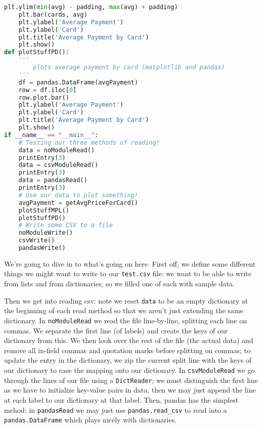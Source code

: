 \documentclass[11pt, twoside, reqno]{book}
\begin{document}
\begin{lstlisting}[language=Python]
    plt.ylim(min(avg) - padding, max(avg) + padding)
    plt.bar(cards, avg)
    plt.ylabel('Average Payment')
    plt.ylabel('Card')
    plt.title('Average Payment by Card')
    plt.show()
def plotStuffPD():
    '''
        plots average payment by card (matplotlib and pandas)
    '''
    df = pandas.DataFrame(avgPayment)
    row = df.iloc[0]
    row.plot.bar()
    plt.ylabel('Average Payment')
    plt.ylabel('Card')
    plt.title('Average Payment by Card')
    plt.show()
if __name__ == "__main__":
    # Testing our three methods of reading!
    data = noModuleRead()
    printEntry(3)
    data = csvModuleRead()
    printEntry(3)
    data = pandasRead()
    printEntry(3)
    # Use our data to plot something!
    avgPayment = getAvgPriceForCard()
    plotStuffMPL()
    plotStuffPD()
    # Write some CSV to a file
    noModuleWrite()
    csvWrite()
    pandasWrite()
\end{lstlisting}

We're going to dive in to what's going on here. First off, we define some different things we might want to write to our \texttt{test.csv} file: we want to be able to write from lists and from dictionaries, so we filled one of each with sample data.

Then we get into reading csv: note we reset \texttt{data} to be an empty dictionary at the beginning of each read method so that we aren't just extending the same dictionary. In \texttt{noModuleRead} we read the file line-by-line, splitting each line on commas. We separate the first line (of labels) and create the keys of our dictionary from this. We then look over the rest of the file (the actual data) and remove all in-field commas and quotation marks before splitting on commas; to update the entry in the dictionary, we zip the current split line with the keys of our dictionary to ease the mapping onto our dictionary. In \texttt{csvModuleRead} we go through the lines of our file using a \texttt{DictReader}; we must distinguish the first line as we have to initialize key-value pairs in data, then we may just append the line at each label to our dictionary at that label. Then, pandas has the simplest mehod: in \texttt{pandasRead} we may just use \texttt{pandas.read\_csv} to read into a \texttt{pandas.DataFrame} which plays nicely with dictionaries.
\end{document}
